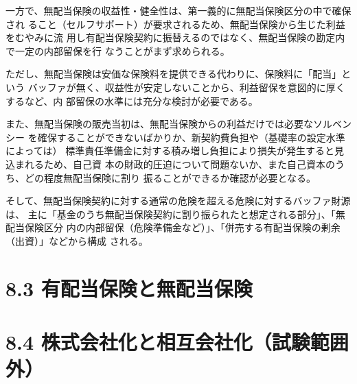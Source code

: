 \documentclass[report,gutter=10mm,fore-edge=10mm,uplatex,dvipdfmx]{jlreq}
\begin{document}
一方で、無配当保険の収益性・健全性は、第一義的に無配当保険区分の中で確保され
ること（セルフサポート）が要求されるため、無配当保険から生じた利益をむやみに流
用し有配当保険契約に振替えるのではなく、無配当保険の勘定内で一定の内部留保を行
なうことがまず求められる。

ただし、無配当保険は安価な保険料を提供できる代わりに、保険料に「配当」という
バッファが無く、収益性が安定しないことから、利益留保を意図的に厚くするなど、内
部留保の水準には充分な検討が必要である。

また、無配当保険の販売当初は、無配当保険からの利益だけでは必要なソルベンシー
を確保することができないばかりか、新契約費負担や（基礎率の設定水準によっては）
標準責任準備金に対する積み増し負担により損失が発生すると見込まれるため、自己資
本の財政的圧迫について問題ないか、また自己資本のうち、どの程度無配当保険に割り
振ることができるか確認が必要となる。

そして、無配当保険契約に対する通常の危険を超える危険に対するバッファ財源は、
主に「基金のうち無配当保険契約に割り振られたと想定される部分」、「無配当保険区分
内の内部留保（危険準備金など）」、「併売する有配当保険の剰余（出資）」などから構成
される。

\section{8.3 有配当保険と無配当保険}
\section{8.4 株式会社化と相互会社化（試験範囲外）}

\end{document}
